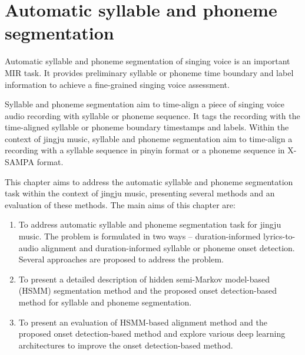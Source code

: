\makeatletter
\def\BState{\State\hskip-\ALG@thistlm}
\makeatother

\chapter{Automatic syllable and phoneme segmentation}\label{chap:segmentation}

Automatic syllable and phoneme segmentation of singing voice is an important MIR task. It provides preliminary syllable or phoneme time boundary and label information to achieve a fine-grained singing voice assessment.

Syllable and phoneme segmentation aim to time-align a piece of singing voice audio recording with syllable or phoneme sequence. It tags the recording with the time-aligned syllable or phoneme boundary timestamps and labels. Within the context of jingju music, syllable and phoneme segmentation aim to time-align a recording with a syllable sequence in pinyin format or a phoneme sequence in X-SAMPA format.

This chapter aims to address the automatic syllable and phoneme segmentation task within the context of jingju music, presenting several methods and an evaluation of these methods. The main aims of this chapter are:

\begin{enumerate}[leftmargin=*]

\item To address automatic syllable and phoneme segmentation task for jingju music. The problem is formulated in two ways -- duration-informed lyrics-to-audio alignment and duration-informed syllable or phoneme onset detection. Several approaches are proposed to address the problem.
\item To present a detailed description of hidden semi-Markov model-based (HSMM) segmentation method and the proposed onset detection-based method for syllable and phoneme segmentation.
\item To present an evaluation of HSMM-based alignment method and the proposed onset detection-based method and explore various deep learning architectures to improve the onset detection-based method.
\end{enumerate}

